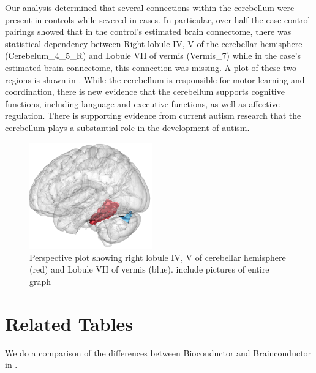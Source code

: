 \documentclass{nature}
\begin{document}
Our analysis determined that several connections within the cerebellum were present
in controls while severed in cases. In particular, over half the case-control
pairings showed that in the control's estimated brain connectome, 
there was statistical dependency between Right lobule IV, V of the cerebellar
hemisphere (Cerebelum\_4\_5\_R) and Lobule VII of vermis (Vermis\_7) while in the
case's estimated brain connectome, this connection was missing. A plot
of these two regions is shown in . While the cerebellum
is responsible for motor learning and coordination, there is new evidence that
the cerebellum supports cognitive functions, including language and executive functions,
as well as affective regulation\cite{goines2011autoantibodies,braunschweig2012maternal}.
There is supporting evidence from current autism research that the cerebellum plays
a substantial role in the development of autism\cite{d2015cerebellar,becker2013autism,wang2014cerebellum}.

\begin{figure}[tb]
\centering
\includegraphics[width=150pt]{fig/brainconductor/aal_view.png}
\caption{Perspective plot showing right lobule IV, V of cerebellar hemisphere
(red) and Lobule VII of vermis (blue). {\color{red}include pictures of entire graph}}
\label{fig:aalconnectome}
\end{figure}

\newpage
\appendix

\section{Related Tables}


We do a comparison of the differences between Bioconductor and Brainconductor
in .
\end{document}

